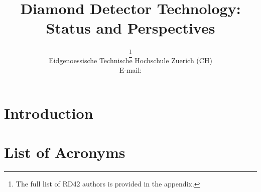 \documentclass{PoS}
\title{Diamond Detector Technology: Status and Perspectives}
\author{\speaker{Michael Reichmann}%
        \thanks{The full list of RD42 authors is provided in the appendix.}\\
       Eidgenoessische Technische Hochschule Zuerich (CH)\\
       E-mail: \email{michael.reichmann@cern.ch}}
\begin{document}
\section{Introduction}



\newpage
\section*{List of Acronyms}




\end{document}
